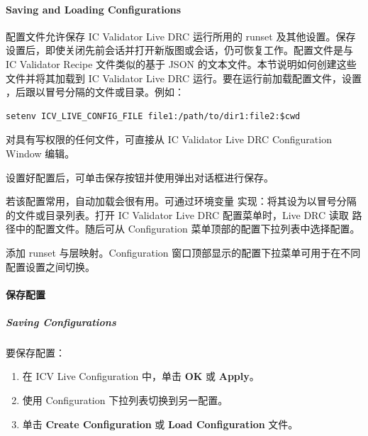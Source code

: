 \paragraph*{Saving and Loading Configurations}

配置文件允许保存 IC Validator Live DRC 运行所用的 runset 及其他设置。保存设置后，即使关闭先前会话并打开新版图或会话，仍可恢复工作。配置文件是与 IC Validator Recipe 文件类似的基于 JSON 的文本文件。本节说明如何创建这些文件并将其加载到 IC Validator Live DRC 运行。要在运行前加载配置文件，设置 ，后跟以冒号分隔的文件或目录。例如：
\begin{lstlisting}
setenv ICV_LIVE_CONFIG_FILE file1:/path/to/dir1:file2:$cwd
\end{lstlisting}

对具有写权限的任何文件，可直接从 IC Validator Live DRC Configuration Window 编辑。

设置好配置后，可单击保存按钮并使用弹出对话框进行保存。

若该配置常用，自动加载会很有用。可通过环境变量  实现：将其设为以冒号分隔的文件或目录列表。打开 IC Validator Live DRC 配置菜单时，Live DRC 读取  路径中的配置文件。随后可从 Configuration 菜单顶部的配置下拉列表中选择配置。


添加 runset 与层映射。Configuration 窗口顶部显示的配置下拉菜单可用于在不同配置设置之间切换。

\paragraph{保存配置}
\subparagraph*{Saving Configurations}

要保存配置：
\begin{enumerate}
  \item 在 ICV Live Configuration 中，单击 \textbf{OK} 或 \textbf{Apply}。
  \item 使用 Configuration 下拉列表切换到另一配置。
\end{enumerate}


\begin{enumerate}
  \setcounter{enumi}{2}
  \item 单击 \textbf{Create Configuration} 或 \textbf{Load Configuration} 文件。
\end{enumerate}

